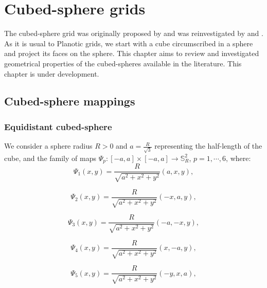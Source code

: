 \chapter{Cubed-sphere grids}
\label{chp-cs-grids}

The cubed-sphere grid was originally proposed by \citet{sadourny:1972}
and was reinvestigated by \citet{ronchi:1996} and \citet{rancic:1996}.
As it is usual to Planotic grids, we start with a cube circumscribed
in a sphere and project its faces on the sphere.
This chapter aims to review and investigated geometrical properties
of the cubed-spheres available in the literature.
This chapter is under development.


\section{Cubed-sphere mappings}
\label{cs-mappings}

\subsection{Equidistant cubed-sphere}
\label{equidistant-cs}

We consider a sphere radius $R>0$ and
$a = \frac{R}{\sqrt{3}}$ representing the half-length of 
the cube, and the family of maps
$\Psi_{p}: [-a,a] \times [-a,a] \to \mathbb{S}^2_R$, $p=1, \cdots, 6$,
where:
\begin{equation}
	\label{chp3-eqdistant-psi1}
	\Psi_{1}(x,y) = \frac{R}{\sqrt{a^2 + x^2 + y^2}}(a, x, y), 
\end{equation}

\begin{equation}
	\label{chp3-eqdistant-psi2}
	\Psi_{2}(x,y) = \frac{R}{\sqrt{a^2 + x^2 + y^2}}(-x, a, y), 
\end{equation}

\begin{equation}
	\label{chp3-eqdistant-psi3}
	\Psi_{3}(x,y) = \frac{R}{\sqrt{a^2 + x^2 + y^2}}(-a, -x, y), 
\end{equation}

\begin{equation}
	\label{chp3-eqdistant-psi4}
	\Psi_{4}(x,y) = \frac{R}{\sqrt{a^2 + x^2 + y^2}}(x, -a, y), 
\end{equation}

\begin{equation}
	\label{chp3-eqdistant-psi5}
	\Psi_{5}(x,y) = \frac{R}{\sqrt{a^2 + x^2 + y^2}}(-y, x, a), 
\end{equation}

